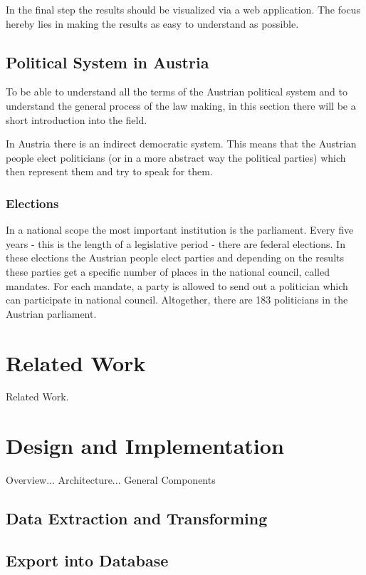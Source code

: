 \documentclass[12pt]{report}
\begin{document}
In the final step the results should be visualized via a web application. The focus hereby lies in making the results as easy to understand as possible.

\section{Political System in Austria}
To be able to understand all the terms of the Austrian political system and to understand the general process of the law making, in this section there will be a short introduction into the field.

In Austria there is an indirect democratic system. This means that the Austrian people elect politicians (or in a more abstract way the political parties) which then represent them and try to speak for them.

\subsection{Elections}
In a national scope the most important institution is the parliament. Every five years - this is the length of a legislative period - there are federal elections. In these elections the Austrian people elect parties and depending on the results these parties get a specific number of places in the national council, called mandates. For each mandate, a party is allowed to send out a politician which can participate in national council. Altogether, there are 183 politicians in the Austrian parliament.

\chapter{Related Work}
Related Work.

\chapter{Design and Implementation}

Overview... Architecture... General Components

\section{Data Extraction and Transforming}

\section{Export into Database}
\end{document}
